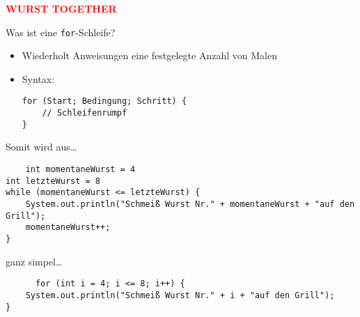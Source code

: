 \documentclass{../../presentation}
\begin{document}
\begin{frame}[plain]
  \centering
  {\Huge\bfseries\textcolor{red}{WURST TOGETHER}}
\end{frame}



\begin{frame}[fragile]{Was ist eine \texttt{for}-Schleife?}

  \begin{itemize}
    \item Wiederholt Anweisungen eine festgelegte Anzahl von Malen
    \item Syntax:
          \begin{verbatim}
for (Start; Bedingung; Schritt) {
    // Schleifenrumpf
}
\end{verbatim}
  \end{itemize}
\end{frame}



\begin{frame}[fragile]
  Somit wird aus\dots

  \begin{verbatim}
    int momentaneWurst = 4
int letzteWurst = 8
while (momentaneWurst <= letzteWurst) {
	System.out.println("Schmeiß Wurst Nr." + momentaneWurst + "auf den Grill");
	momentaneWurst++;
}
  \end{verbatim}
  ganz simpel\dots
  \begin{verbatim}
      for (int i = 4; i <= 8; i++) {
	System.out.println("Schmeiß Wurst Nr." + i + "auf den Grill");
}
  \end{verbatim}

\end{frame}
\end{document}
